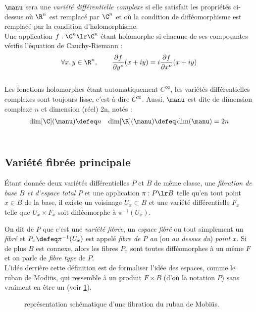 $\manu$ sera une \emph{variété différentielle complexe} si elle satisfait les propriétés ci-dessus où $\R^n$ est remplacé par $\C^n$ et où la condition de difféomorphisme est remplacé par la condition d'holomorphisme. 
\\
Une application $f : \C^n\lr \C^n$ étant holomorphe si chacune de ses composantes vérifie l'équation de Cauchy-Riemann :
\[\forall x,y\in\R^n,\qquad \frac{\partial f }{\partial y^\nu}(x+iy) = i \frac{\partial f }{\partial x^\nu}(x+iy)\]
\\
Les fonctions holomorphes étant automatiquement $C^\infty$, les variétés différentielles complexes sont toujours lisse, c'est-à-dire $C^\infty$. Aussi, $\manu$ est dite de dimension complexe $n$ et dimension (réel) 2n, notés :
\begin{align}
	\dim[\C](\manu) &\defeq n  &  \dim[\R] (\manu) \defeq \dim (\manu) = 2n
\end{align}
\\



\subsection{Variété fibrée principale}

\begin{definition}
	\'Etant donnée deux variétés différentielles $P$ et $B$ de même classe, une \emph{fibration de base $B$ et d'espace total $P$} et une application $\pi : P\lr B$ telle qu'en tout point $x\in B$ de la base, il existe un voisinage $U_x\subset B$ et une variété différentielle $F_x$ telle que $U_x\times F_x$ soit difféomorphe à $\pi^{-1}(U_x)$.
	
	On dit de $P$ que c'est une \emph{variété fibrée}, un \emph{espace fibré} ou tout simplement un \emph{fibré} et $P_x \defeq \pi^{-1}(U_x)$ est appelé \emph{fibre de $P$ au} (ou \emph{au dessus du}) \emph{point} $x$.
	Si de plus $B$ est connexe, alors les fibres $P_x$ sont toutes difféomorphes à un même $F$ et on parle de \emph{fibre type} de $P$.
	\\
	
	L'idée derrière cette définition est de formaliser l'idée des espaces, comme le ruban de Modiüs, qui ressemble à un produit $F\times B$ (d'où la notation $P$) sans vraiment en être un (voir \cref{fig:fibration}).
\end{definition}

\begin{figure}[h]\centering
	\caption{représentation schématique d'une fibration du ruban de Mobiüs.}
	\label{fig:fibration}
\end{figure}


